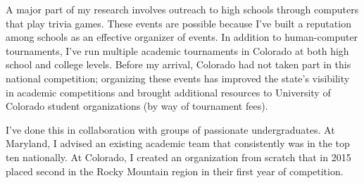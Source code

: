 \documentclass[11pt]{amsart}
\begin{document}
A major part of my research involves outreach to high schools through computers
that play trivia games.  These events are possible because I've built a
reputation among schools as an effective organizer of events.  In addition to
human-computer tournaments, I've run multiple academic tournaments in Colorado
at both high school and college levels.  Before my arrival, Colorado had not
taken part in this national competition; organizing these events has improved
the state's visibility in academic competitions and brought additional resources
to University of Colorado student organizations (by way of tournament fees).

I've done this in collaboration with groups of passionate
undergraduates.  At Maryland, I advised an existing academic team that
consistently was in the top ten nationally.  At Colorado, I created an
organization from scratch that in 2015 placed second in the Rocky
Mountain region in their first year of competition.


%
%
\end{document}
